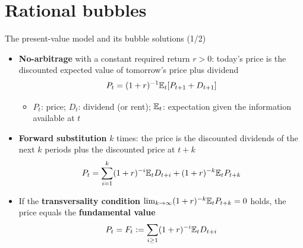 \section{Rational bubbles}

\begin{frame}{The present-value model and its bubble solutions (1/2)}
\itemsize{\small}
\begin{itemize}
    \item \textbf{No-arbitrage} with a constant required return $r > 0$: today's price is the discounted expected value of tomorrow's price plus dividend \[ P_t = (1 + r)^{-1}\mathbb{E}_t[P_{t+1} + D_{t+1}] \]
    \begin{itemize}
        \item $P_t$: price; $D_t$: dividend (or rent); $\mathbb{E}_t$: expectation given the information available at $t$
    \end{itemize}
    \item \textbf{Forward substitution} $k$ times: the price is the discounted dividends of the next $k$ periods plus the discounted price at $t + k$ \[ P_t = \sum_{i=1}^{k}(1 + r)^{-i}\mathbb{E}_t D_{t+i} + (1 + r)^{-k}\mathbb{E}_t P_{t+k} \]
    \item If the \textbf{transversality condition} $\lim_{k\to\infty} (1 + r)^{-k}\mathbb{E}_t P_{t+k} = 0$ holds, the price equals the \textbf{fundamental value} \[ P_t = F_t := \sum_{i \ge 1}(1 + r)^{-i}\mathbb{E}_t D_{t+i} \]
\end{itemize}
\end{frame}

